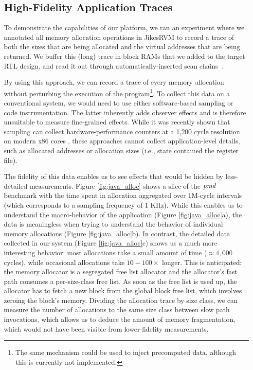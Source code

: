 \subsection{High-Fidelity Application Traces}

To demonstrate the capabilities of our platform, we ran an experiment where we
annotated all memory allocation operations in JikesRVM to record a trace of
both the sizes that are being allocated and the virtual addresses that are
being returned. We buffer this (long) trace in block RAMs that we added to the
target RTL design, and read it out through automatically-inserted scan
chains~\cite{strober}.

By using this approach, we can record a trace of every memory allocation
without perturbing the execution of the program\footnote{The same mechanism
could be used to inject precomputed data, although this is currently not
implemented.}. To collect this data on a conventional system, we would need to
use either software-based sampling or code instrumentation. The latter
inherently adds observer effects and is therefore unsuitable to measure
fine-grained effects. While it was recently shown that sampling can collect
hardware-performance counters at a 1,200 cycle resolution on modern x86 cores
\cite{Yang:2015:CPM:2749469.2750401}, these approaches cannot collect
application-level details, such as allocated addresses or allocation sizes
(i.e., state contained the register file).

The fidelity of this data enables us to see effects that would be hidden by
less-detailed measurements. Figure \ref{fig:java_alloc} shows a slice of the
$\emph{pmd}$ benchmark with the time spent in allocation aggregated over
1M-cycle intervals (which corresponds to a sampling frequency of 1 KHz). While
this enables us to understand the macro-behavior of the application (Figure
\ref{fig:java_alloc}a), the data is meaningless when trying to understand the
behavior of individual memory allocations (Figure \ref{fig:java_alloc}b). In
contrast, the detailed data collected in our system (Figure
\ref{fig:java_alloc}c) shows us a much more interesting behavior: most
allocations take a small amount of time ($\approx 4,000$ cycles), while
occasional allocations take $10-100\times$ longer. This is anticipated: the
memory allocator is a segregated free list allocator and the allocator's fast
path consumes a per-size-class free list. As soon as the free list is used up,
the allocator has to fetch a new block from the global block free list, which
involves zeroing the block's memory. Dividing the allocation trace by size
class, we can measure the number of allocations to the same size class between
slow path invocations, which allows us to deduce the amount of memory
fragmentation, which would not have been visible from lower-fidelity
measurements.


